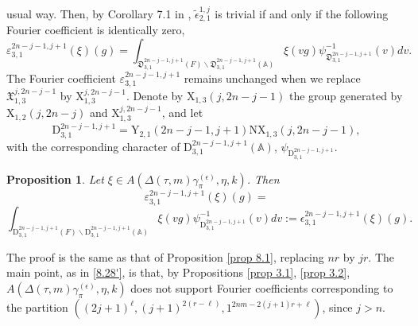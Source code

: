 \documentclass[12pts]{amsart}
\newcommand{\BA}{{\mathbb {A}}}
\newtheorem{prop}[thm]{Proposition}
\begin{document}
usual way. Then, by Corollary 7.1 in \cite{GRS11},
$\widetilde{\epsilon}_{2,1}^{1,j}$ is trivial if and only if the
following Fourier coefficient is identically zero,
\begin{equation}\label{8.35}
\varepsilon_{3,1}^{2n-j-1,j+1}(\xi)(g)=\int_{\mathfrak{D}_{3,1}^{2n-j-1,j+1}(F)\backslash
	\mathfrak{D}_{3,1}^{2n-j-1,j+1}(\BA)}\xi(vg)\psi_{\mathfrak{D}_{3,1}^{2n-j-1,j+1}}^{-1}(v)dv.
\end{equation}
The Fourier coefficient $\varepsilon_{3,1}^{2n-j-1,j+1}$ remains
unchanged when we replace $\mathfrak{X}_{1,3}^{j,2n-j-1}$ by
$\mathrm{X}_{1,3}^{j,2n-j-1}$. Denote by
$\mathrm{X}_{1,3}(j,2n-j-1)$ the group generated by
$\mathrm{X}_{1,2}(j,2n-j)$ and $\mathrm{X}_{1,3}^{j,2n-j-1}$, and
let
\begin{equation}\label{8.36}
\mathrm{D}_{3,1}^{2n-j-1,j+1}=\mathrm{Y}_{2,1}(2n-j-1,j+1)\mathrm{N}\mathrm{X}_{1,3}(j,2n-j-1),
\end{equation}
with the corresponding character of
$\mathrm{D}_{3,1}^{2n-j-1,j+1}(\BA)$,
$\psi_{\mathrm{D}_{3,1}^{2n-j-1,j+1}}$.
\begin{prop}\label{prop 8.6}
	Let $\xi\in A(\Delta(\tau,m)\gamma_\pi^{(\epsilon)},\eta,k)$. Then
	\begin{equation}\label{8.37}
	\varepsilon_{3,1}^{2n-j-1,j+1}(\xi)(g)=
	\end{equation}
	$$
	\int_{\mathrm{D}_{3,1}^{2n-j-1,j+1}(F)\backslash
		\mathrm{D}_{3,1}^{2n-j-1,j+1}(\BA)}\xi(vg)\psi_{\mathrm{D}_{3,1}^{2n-j-1,j+1}}^{-1}(v)dv:=\epsilon_{3,1}^{2n-j-1,j+1}(\xi)(g).
	$$
\end{prop}
The proof is the same as that of Proposition \ref{prop 8.1},
replacing $nr$ by $jr$. The main point, as in \eqref{8.28'}, is
that, by Propositions \ref{prop 3.1}, \ref{prop 3.2}, $A(\Delta(\tau,m)\gamma_\pi^{(\epsilon)},\eta,k)$ does not support
Fourier coefficients corresponding to the partition $((2j+1)^\ell,
(j+1)^{2(r-\ell)},1^{2nm-2(j+1)r+\ell})$, since $j>n$.
\end{document}
